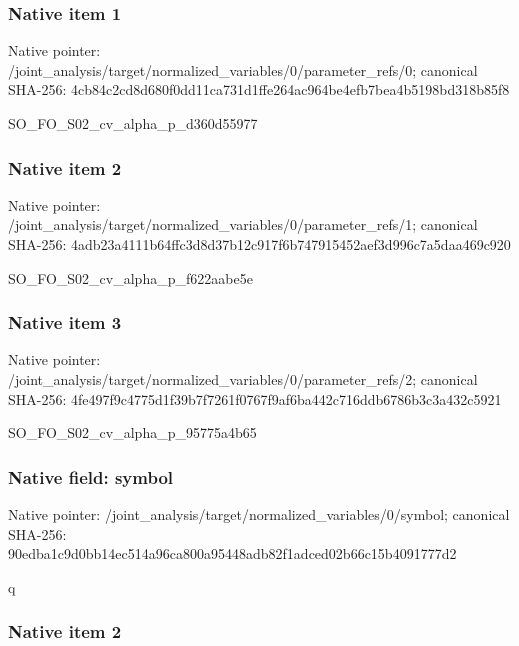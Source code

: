 \documentclass[10pt,a4paper]{article}
\begin{document}
\subsubsection{Native item 1}


Native pointer: /joint\_analysis/target/n\allowbreak{}ormalized\_variables/0/pa\allowbreak{}rameter\_refs/0; canonical SHA-256: 4cb84c2cd8d680f0dd11ca73\allowbreak{}1d1ffe264ac964be4efb7bea\allowbreak{}4b5198bd318b85f8


SO\_FO\_S02\_cv\_alpha\_p\_d360d55977


\subsubsection{Native item 2}


Native pointer: /joint\_analysis/target/n\allowbreak{}ormalized\_variables/0/pa\allowbreak{}rameter\_refs/1; canonical SHA-256: 4adb23a4111b64ffc3d8d37b\allowbreak{}12c917f6b747915452aef3d9\allowbreak{}96c7a5daa469c920


SO\_FO\_S02\_cv\_alpha\_p\_f622aabe5e


\subsubsection{Native item 3}


Native pointer: /joint\_analysis/target/n\allowbreak{}ormalized\_variables/0/pa\allowbreak{}rameter\_refs/2; canonical SHA-256: 4fe497f9c4775d1f39b7f726\allowbreak{}1f0767f9af6ba442c716ddb6\allowbreak{}786b3c3a432c5921


SO\_FO\_S02\_cv\_alpha\_p\_95775a4b65


\subsubsection{Native field: symbol}


Native pointer: /joint\_analysis/target/n\allowbreak{}ormalized\_variables/0/sy\allowbreak{}mbol; canonical SHA-256: 90edba1c9d0bb14ec514a96c\allowbreak{}a800a95448adb82f1adced02\allowbreak{}b66c15b4091777d2


q


\subsubsection{Native item 2}
\end{document}
